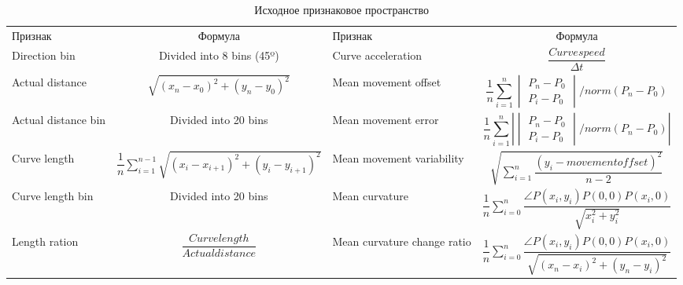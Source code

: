 \documentclass[12pt]{article}
\begin{document}
    \begin{table}[h]
        \centering
        \footnotesize
        \renewcommand{\arraystretch}{1.5}
        \renewcommand{\tabcolsep}{1mm}
        \caption{Исходное признаковое пространство}
        \begin{tabular}[c]{ || m{20mm} | c || m{20mm} | c ||}
            \hhline{|t:==:t:==:t|} 
            Признак & Формула &  Признак &  Формула \\ [2mm]
            \hhline{|:==::==:|} 
            Direction bin & \centering Divided into 8 bins (45º) &
            Curve acceleration & {\centering $\dfrac{Curvespeed}{\Delta t}$} \\
            \hhline{||-|-||-|-||}
            Actual distance & {\centering $\sqrt{(x_n-x_0)^2 + (y_n-y_0)^2}$} &
            Mean movement offset & \begin{equation*} \dfrac{1}{n} \sum_{i=1}^{n} \begin{vmatrix} P_n - P_0 \\ P_i - P_0  \end{vmatrix} / norm(P_n - P_0) \end{equation*} \\
            \hhline{||-|-||-|-||}
            Actual distance bin & {\centering Divided into 20 bins} &
            Mean movement error & {\centering \begin{equation*} \dfrac{1}{n} \sum_{i=1}^{n} \left| \begin{vmatrix} P_n - P_0 \\ P_i - P_0  \end{vmatrix} / norm(P_n - P_0) \right| \end{equation*}} \\
            \hhline{||-|-||-|-||}
            Curve length & {\centering $\dfrac{1}{n} \sum_{i=1}^{n-1} \sqrt{(x_i-x_{i+1})^2 + (y_i-y_{i+1})^2}$} &
            Mean movement variability & {\centering $\sqrt{\sum_{i=1}^{n} \dfrac{(y_i - movementoffset)^2}{n-2}}$} \\
            \hhline{||-|-||-|-||}
            Curve length bin & {\centering Divided into 20 bins} &
            Mean curvature & {\centering $\dfrac{1}{n} \sum_{i=0}^{n} \dfrac{\angle P(x_i, y_i)P(0,0)P(x_i, 0)}{\sqrt{x_{i}^2 + y_{i}^2}}$} \\
            \hhline{||-|-||-|-||}
            Length ration & {\centering $\dfrac{Curvelength}{Actualdistance}$} &
            Mean curvature change ratio & {\centering $\dfrac{1}{n} \sum_{i=0}^{n} \dfrac{\angle P(x_i, y_i)P(0,0)P(x_i, 0)}{\sqrt{(x_n-x_i)^2 + (y_n-y_i)^2}}$} \\

\end{tabular}
\end{table}
\end{document}
